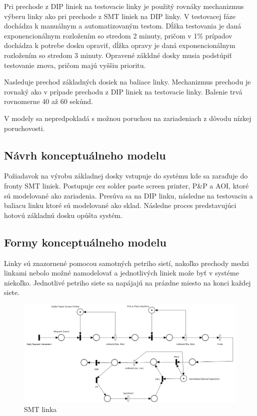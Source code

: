 \documentclass[12pt,a4paper,titlepage,final]{article}
\begin{document}
Pri prechode z DIP liniek na testovacie linky je použitý rovnáky mechanizmus
výberu linky ako pri prechode z SMT liniek na DIP linky. V testovacej fáze 
dochádza k manuálnym a automatizovaným testom. Dĺžka testovania je daná 
exponencionálnym rozložením so stredom 2 minuty, pričom v 1\% prípadov dochádza
k potrebe dosku opraviť, dĺžka opravy je daná exponencionálnym rozložením so
stredom 3 minuty. Opravené zákldné dosky musia podstúpiť testovanie znova, pričom
majú vyššiu prioritu.

Nasleduje prechod základných dosiek na baliace linky. Mechanizmus prechodu je
rovnaký ako v prípade prechodu z DIP liniek na testovacie linky. Balenie trvá 
rovnomerne 40 až 60 sekúnd.

V modely sa nepredpokladá s možnou poruchou na zariadeniach z dôvodu nízkej
poruchovosti.

\subsection{Návrh konceptuálneho modelu}
Požiadavok na výrobu základnej dosky vstupuje do systému kde sa zaraďuje do fronty
SMT liniek. Postupuje cez solder paste screen printer, P\&P a AOI, ktoré 
sú modelované ako zariadenia. Presúva sa na DIP linku, následne na testovaciu
a baliacu linku ktoré sú modelované ako sklad. Následne proces predstavujúci
hotovú základnú dosku opúšta systém.

\subsection{Formy konceptuálneho modelu}
Linky sú znazornené pomocou samotných petriho sietí, nakoľko prechody medzi linkami
nebolo možné namodelovať a jednotlivých liniek može byť v systéme niekoľko.
Jednotlivé petriho siete sa napájajú na prázdne miesto na konci každej
siete. 

\begin{figure}[!h]
  \centering
  \includegraphics[width=17cm]{doc/smt.png}
  \caption{SMT linka}
\end{figure}
\end{document}

